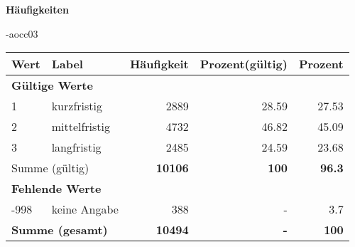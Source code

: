         		\vspace*{0.5cm}
                \noindent\textbf{Häufigkeiten}

                \vspace*{-\baselineskip}
					\begin{filecontents}{\jobname-aocc03}
					\begin{longtable}{lXrrr}
					\toprule
					\textbf{Wert} & \textbf{Label} & \textbf{Häufigkeit} & \textbf{Prozent(gültig)} & \textbf{Prozent} \\
					\endhead
					\midrule
					\multicolumn{5}{l}{\textbf{Gültige Werte}}\\

					1 &
					\multicolumn{1}{X}{ kurzfristig   } &


					  \num{2889} &
					  \num[round-mode=places,round-precision=2]{28.59} &
					    \num[round-mode=places,round-precision=2]{27.53} \\

					2 &
					\multicolumn{1}{X}{ mittelfristig   } &


					  \num{4732} &
					  \num[round-mode=places,round-precision=2]{46.82} &
					    \num[round-mode=places,round-precision=2]{45.09} \\

					3 &
					\multicolumn{1}{X}{ langfristig   } &


					  \num{2485} &
					  \num[round-mode=places,round-precision=2]{24.59} &
					    \num[round-mode=places,round-precision=2]{23.68} \\
					\midrule
					\multicolumn{2}{l}{Summe (gültig)} &
					  \textbf{\num{10106}} &
					\textbf{\num{100}} &
					  \textbf{\num[round-mode=places,round-precision=2]{96.3}} \\
					\multicolumn{5}{l}{\textbf{Fehlende Werte}}\\
							-998 &
							keine Angabe &
							  \num{388} &
							 - &
							  \num[round-mode=places,round-precision=2]{3.7} \\
					\midrule
					\multicolumn{2}{l}{\textbf{Summe (gesamt)}} &
				      \textbf{\num{10494}} &
				    \textbf{-} &
				    \textbf{\num{100}} \\
					\bottomrule
					\end{longtable}
					\end{filecontents}
